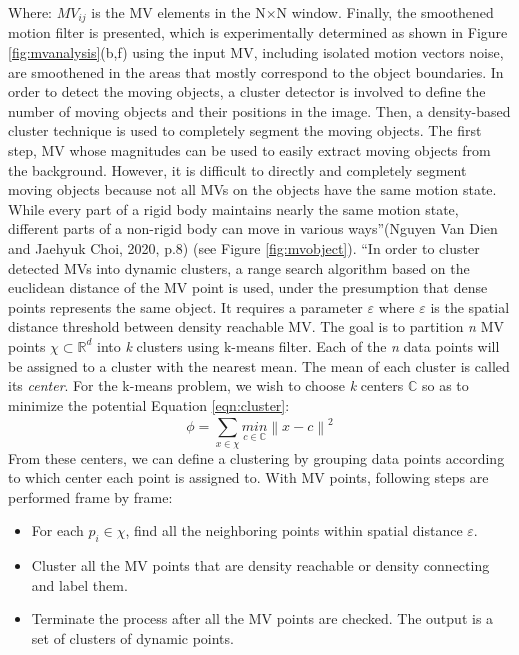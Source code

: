 Where: $MV_{ij}$ is the MV elements in the N×N window. Finally, the smoothened motion filter is presented, which is experimentally determined as shown in Figure \ref{fig:mvanalysis}(b,f) using the input MV, including isolated motion vectors noise, are smoothened in the areas that mostly correspond to the object boundaries. In order to detect the moving objects, a cluster detector is involved to define the number of moving objects and their positions in the image. Then, a density-based cluster technique is used to completely segment the moving objects. The first step, MV whose magnitudes can be used to easily extract moving objects from the background. However, it is difficult to directly and completely segment moving objects because not all MVs on the objects have the same motion state. While every part of a rigid body maintains nearly the same motion state, different parts of a non-rigid body can move in various ways”(Nguyen Van Dien and Jaehyuk Choi, 2020, p.8) (see Figure \ref{fig:mvobject}). “In order to cluster detected MVs into dynamic clusters, a range search algorithm based on the euclidean distance of the MV point is used, under the presumption that dense points represents the same object. It requires a parameter $\varepsilon$ where $\varepsilon$ is the spatial distance threshold between density reachable MV. The goal is to partition \textit{n} MV points $\chi \subset \mathbb{R}^{d}$ into \textit{k} clusters using k-means filter. Each of the \textit{n} data points will be assigned to a cluster with the nearest mean. The mean of each cluster is called its \textit{center}. For the k-means problem, we wish to choose \textit{k} centers $\mathbb{C}$ so as to minimize the potential Equation \ref{eqn:cluster}: \\
\begin{equation}
\label{eqn:cluster}
\phi = \sum_{x \in \chi}^{}\underset{c \in \mathbb{C}}{min}\left \| x - c \right \|^{2}
\end{equation} 
From these centers, we can define a clustering by grouping data points according to which center each point is assigned to. With MV points, following steps are performed frame by frame:
\begin{itemize}
\item For each $p_{i} \in \chi$, find all the neighboring points within spatial distance $\varepsilon$.
\item Cluster all the MV points that are density reachable or density connecting \cite{ester1996density} and label them.
\item Terminate the process after all the MV points are checked. The output is a set of clusters of dynamic points.
\end{itemize}
